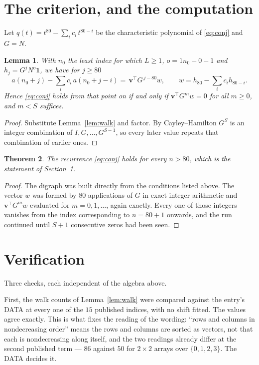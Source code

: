 \documentclass[11pt,a4paper]{article}
\theoremstyle{plain}
\newtheorem{theorem}{Theorem}
\newtheorem{lemma}[theorem]{Lemma}
\theoremstyle{definition}
\begin{document}
\section{The criterion, and the computation}

Let $q(t)=t^{80}-\sum_i c_i\,t^{80-i}$ be the characteristic polynomial of
\eqref{eq:conj} and $G=N$.

\begin{lemma}\label{lem:crit}
With $n_0$ the least index for which $L\ge1$, $o=1n_0+0-1$ and
$h_j=G^{j}N^{o}\mathbf{1}$, we have for $j\ge80$
\[
a(n_0+j)-\sum_i c_i\,a(n_0+j-i)=\,\mathbf{v}^{\!\top}G^{\,j-80}w,
\qquad w=h_{80}-\sum_i c_ih_{80-i} .
\]
Hence \eqref{eq:conj} holds from that point on if and only if
$\mathbf{v}^{\!\top}G^{m}w=0$ for all $m\ge0$, and $m<S$ suffices.
\end{lemma}

\begin{proof}
Substitute Lemma~\ref{lem:walk} and factor. By Cayley--Hamilton $G^{S}$ is an integer
combination of $I,G,\dots,G^{S-1}$, so every later value repeats that combination of
earlier ones.
\end{proof}

\begin{theorem}
The recurrence \eqref{eq:conj} holds for every $n>80$, which is the statement of
Section~1.
\end{theorem}

\begin{proof}
The digraph was built directly from the conditions listed above. The vector $w$ was formed by
$80$ applications of $G$ in exact integer arithmetic and $\mathbf{v}^{\!\top}G^{m}w$
evaluated for $m=0,1,\dots$, again exactly. Every one of those integers vanishes from the
index corresponding to $n=80+1$ onwards, and the run continued until $S+1$ consecutive
zeros had been seen.
\end{proof}

\section{Verification}

Three checks, each independent of the algebra above.

First, the walk counts of Lemma~\ref{lem:walk} were compared against the entry's DATA at
every one of the $15$ published indices, with no shift fitted. The values agree exactly.
This is what fixes the reading of the wording: ``rows and columns in nondecreasing order''
means the rows and columns are sorted as vectors, not that each is nondecreasing along
itself, and the two readings already differ at the second published term --- $86$ against
$50$ for $2\times2$ arrays over $\{0,1,2,3\}$. The DATA decides it.
\end{document}
